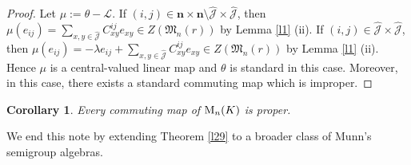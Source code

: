 \documentclass[reqno]{amsart}
\theoremstyle{plain}
\newtheorem{corollary}[theorem]{Corollary}
\theoremstyle{definition}
\newtheorem{remark}[theorem]{Remark}
\begin{document}
\begin{proof}
Let $\mu := \theta - \mathcal{L}$. 
If $(i,j) \in \mathbf{n} \times \mathbf{n} \setminus \hat{\mathcal{J}} \times \hat{\mathcal{J}}$, then $\mu(e_{ij}) = \sum_{x,y \in \hat{\mathcal{J}} } C_{xy}^{ij} e_{xy} \in Z(\mathfrak{M}_n(r))$ by Lemma \ref{l1} (ii). 
If $(i,j) \in \hat{\mathcal{J}} \times \hat{\mathcal{J}}$, then $\mu(e_{ij}) = -\lambda e_{ij} + \sum_{x,y \in \hat{\mathcal{J}} } C_{xy}^{ij} e_{xy} \in Z(\mathfrak{M}_n(r))$ by Lemma \ref{l1} (ii). Hence $\mu$ is a central-valued linear map and $\theta$ is standard in this case. Moreover, in this case, there exists
a standard commuting map which is improper.
\end{proof}


\begin{corollary} 
Every commuting map of ${\rm M}_n(K)$ is proper.
\end{corollary}

%
% 
%

We end this note by extending Theorem \ref{l29} to a broader class of Munn's semigroup algebras.
\end{document}
